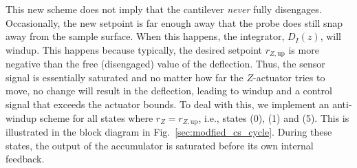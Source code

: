 This new scheme does not imply that the cantilever \emph{never} fully disengages. Occasionally, the new setpoint is far enough away that the probe does still snap away from the sample surface. 
When this happens, the integrator, $D_I(z)$, will windup. This happens because typically, the desired setpoint $r_{Z,\textrm{up}}$ is more negative than the free (disengaged) value of the deflection. Thus, the sensor signal is essentially saturated and no matter how far the $Z$-actuator tries to move, no change will result in the deflection, leading to windup and a control signal that exceeds the actuator bounds. To deal with this, we implement an anti-windup scheme for all states where $r_Z=r_{Z,\textrm{up}}$, i.e., states (0), (1) and (5). This is illustrated in the block diagram in Fig.~\ref{sec:modfied_cs_cycle}. During these states, the output of the accumulator is saturated before its own internal feedback. 

